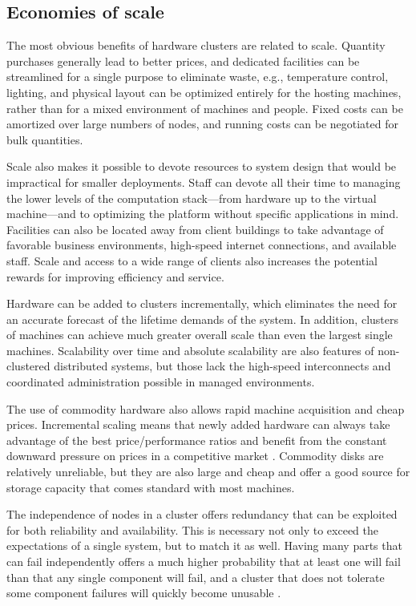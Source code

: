 \subsection{Economies of scale}

The most obvious benefits of hardware clusters are related to scale. Quantity purchases generally lead to better prices, and dedicated facilities can be streamlined for a single purpose to eliminate waste, e.g., temperature control, lighting, and physical layout can be optimized entirely for the hosting machines, rather than for a mixed environment of machines and people. Fixed costs can be amortized over large numbers of nodes, and running costs can be negotiated for bulk quantities.

Scale also makes it possible to devote resources to system design that would be impractical for smaller deployments. Staff can devote all their time to managing the lower levels of the computation stack---from hardware up to the virtual machine---and to optimizing the platform without specific applications in mind. Facilities can also be located away from client buildings to take advantage of favorable business environments, high-speed internet connections, and available staff. Scale and access to a wide range of clients also increases the potential rewards for improving efficiency and service.

Hardware can be added to clusters incrementally, which eliminates the need for an accurate forecast of the lifetime demands of the system. In addition, clusters of machines can achieve much greater overall scale than even the largest single machines. Scalability over time and absolute scalability are also features of non-clustered distributed systems, but those lack the high-speed interconnects and coordinated administration possible in managed environments.

The use of commodity hardware also allows rapid machine acquisition and cheap prices. Incremental scaling means that newly added hardware can always take advantage of the best price/performance ratios and benefit from the constant downward pressure on prices in a competitive market \cite{fox}. Commodity disks are relatively unreliable, but they are also large and cheap and offer a good source for storage capacity \cite{patterson,warfield} that comes standard with most machines.

The independence of nodes in a cluster offers redundancy that can be exploited for both reliability and availability. This is necessary not only to exceed the expectations of a single system, but to match it as well. Having many parts that can fail independently offers a much higher probability that at least one will fail than that any single component will fail, and a cluster that does not tolerate some component failures will quickly become unusable \cite{birrell93}.

